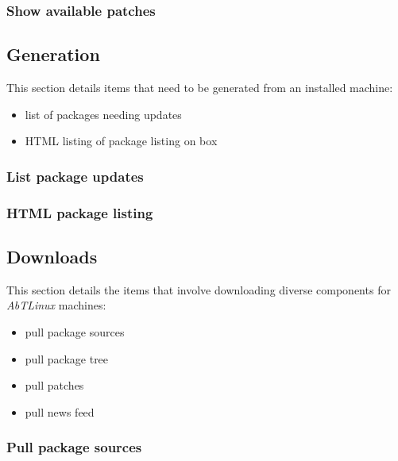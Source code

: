 \newpage
\subsubsection{Show available patches}



\newpage
\subsection{Generation}
This section details items that need to be generated from an installed
machine:

\begin{itemize}
  \item list of packages needing updates
  \item HTML listing of package listing on box
\end{itemize}

%
%
\subsubsection{List package updates}


\newpage
\subsubsection{HTML package listing}



\newpage
\subsection{Downloads}
This section details the items that involve downloading diverse components
for \emph{AbTLinux} machines:

\begin{itemize}
  \item pull package sources
  \item pull package tree
  \item pull patches 
  \item pull news feed 
  \end{itemize}

%
%
\subsubsection{Pull package sources}


\newpage
